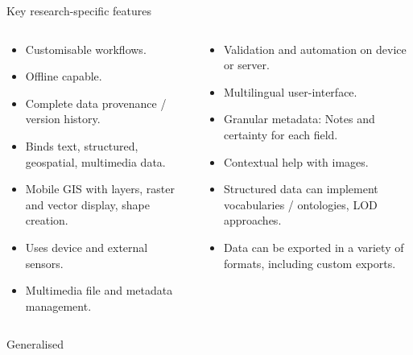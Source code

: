 \documentclass[
	aspectratio=169, %
	12pt, %
	t, %
]{beamer}
\begin{document}
\begin{refsegment}

\begin{frame}{Key research-specific features}
	\begin{columns}[T]
		\begin{column}{0.45\textwidth}
        \begin{itemize}
            \item Customisable workflows.
            \item Offline capable.
            \item Complete data provenance / version history.
            \item Binds text, structured, geospatial, multimedia data.
            \item Mobile GIS with layers, raster and vector display, shape creation.
            \item Uses device and external sensors. 
            \item Multimedia file and metadata management.
        \end{itemize}
    \end{column}
	\begin{column}{0.45\textwidth}
        \begin{itemize}
            \item Validation and automation on device or server.
            \item Multilingual user-interface.
            \item Granular metadata: Notes and certainty for each field.
            \item Contextual help with images.
            \item Structured data can implement vocabularies / ontologies, LOD approaches.
            \item Data can be exported in a variety of formats, including custom exports.
        \end{itemize}
    \end{column}
\end{columns}
\end{frame}

\begin{frame}{Generalised}
 \begin{figure}[H]
    \centering
        \vspace{-0.5cm}


\end{figure}
\end{frame}
\end{refsegment}
\end{document}

